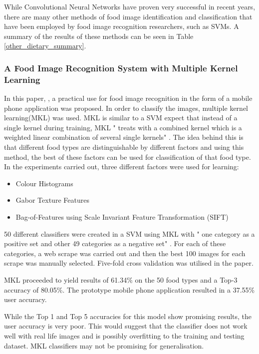While Convolutional Neural Networks have proven very successful in recent years, there are many other methods of food image identification and classification that have been employed by food image recognition researchers, such as SVMs.
A summary of the results of these methods can be seen in Table \ref{other_dietary_summary}.

\subsubsection*{A Food Image Recognition System with Multiple Kernel Learning}
In this paper, \parencite{kernelLearning}, a practical use for food image recognition in the form of a mobile phone application was proposed.
In order to classify the images, multiple kernel learning(MKL) was used.
MKL is similar to a SVM expect that instead of a single kernel during training, MKL " treats with a combined kernel which is a weighted linear combination of several single kernels" \parencite{kernelLearning}.
The idea behind this is that different food types are distinguishable by different factors and using this method, the best of these factors can be used for classification of that food type.
In the experiments carried out, three different factors were used for learning:
\begin{itemize}
	\item{Colour Histograms}
	\item{Gabor Texture Features}
	\item{Bag-of-Features using Scale Invariant Feature Transformation (SIFT)}
\end{itemize}

50 different classifiers were created in a SVM using MKL with " one category as a positive set and other 49 categories as a negative set" \parencite{kernelLearning}.
For each of these categories, a web scrape was carried out and then the best 100 images for each scrape was manually selected. Five-fold cross validation was utilised in the paper.

MKL proceeded to yield results of 61.34\% on the 50 food types and a Top-3 accuracy of 80.05\%.
The prototype mobile phone application resulted in a 37.55\% user accuracy.

While the Top 1 and Top 5 accuracies for this model show promising results, the user accuracy is very poor.
This would suggest that the classifier does not work well with real life images and is possibly overfitting to the training and testing dataset.
MKL classifiers may not be promising for generalisation.

